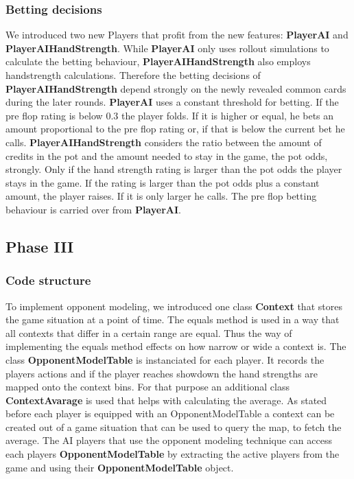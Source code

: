 \subsubsection{Betting decisions}

We introduced two new Players that profit from the new features: \textbf{PlayerAI} and \textbf{PlayerAIHandStrength}. While \textbf{PlayerAI} only uses rollout simulations to calculate the betting behaviour, \textbf{PlayerAIHandStrength} also employs handstrength calculations. Therefore the betting decisions of \textbf{PlayerAIHandStrength} depend strongly on the newly revealed common cards during the later rounds.
\textbf{PlayerAI} uses a constant threshold for betting. If the pre flop rating is below 0.3 the player folds. If it is higher or equal, he bets an amount proportional to the pre flop rating or, if that is below the current bet he calls.
\textbf{PlayerAIHandStrength} considers the ratio between the amount of credits in the pot and the amount needed to stay in the game, the pot odds, strongly. Only if the hand strength rating is larger than the pot odds the player stays in the game. If the rating is larger than the pot odds plus a constant amount, the player raises. If it is only larger he calls. The pre flop betting behaviour is carried over from \textbf{PlayerAI}.  

\subsection{Phase III}

\subsubsection{Code structure}

To implement opponent modeling, we introduced one class \textbf{Context} that stores the game situation at a point of time. The equals method is used in a way that all contexts that differ in a certain range are equal. Thus the way of implementing the equals method effects on how narrow or wide a context is.
The class \textbf{OpponentModelTable} is instanciated for each player. It records the players actions and if the player reaches showdown the hand strengths are mapped onto the context bins. For that purpose an additional class \textbf{ContextAvarage} is used that helps with calculating the average.
As stated before each player is equipped with an OpponentModelTable a context can be created out of a game situation that can be used to query the map, to fetch the average.
The AI players that use the opponent modeling technique can access each players \textbf{OpponentModelTable} by extracting the active players from the game and using their \textbf{OpponentModelTable} object.

